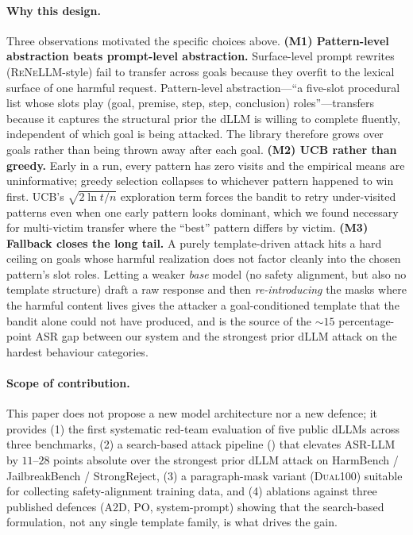 \paragraph{Why this design.}
Three observations motivated the specific choices above.
\textbf{(M1) Pattern-level abstraction beats prompt-level abstraction.}
Surface-level prompt rewrites (\textsc{ReNeLLM}-style) fail to transfer
across goals because they overfit to the lexical surface of one harmful
request. Pattern-level abstraction---``a five-slot procedural list whose
slots play (goal, premise, step, step, conclusion) roles''---transfers
because it captures the structural prior the dLLM is willing to complete
fluently, independent of which goal is being attacked. The library
therefore grows over goals rather than being thrown away after each goal.
\textbf{(M2) UCB rather than greedy.} Early in a run, every pattern has
zero visits and the empirical means are uninformative; greedy selection
collapses to whichever pattern happened to win first. UCB's $\sqrt{2\ln t/n}$
exploration term forces the bandit to retry under-visited patterns even
when one early pattern looks dominant, which we found necessary for
multi-victim transfer where the ``best'' pattern differs by victim.
\textbf{(M3) Fallback closes the long tail.} A purely template-driven
attack hits a hard ceiling on goals whose harmful realization does not
factor cleanly into the chosen pattern's slot roles. Letting a weaker
\emph{base} model (no safety alignment, but also no template structure)
draft a raw response and then \emph{re-introducing} the masks where the
harmful content lives gives the attacker a goal-conditioned template that
the bandit alone could not have produced, and is the source of the
$\sim 15$ percentage-point ASR gap between our system and the strongest
prior dLLM attack on the hardest behaviour categories.

\paragraph{Scope of contribution.}
This paper does not propose a new model architecture nor a new defence; it
provides (1) the first systematic red-team evaluation of five public dLLMs
across three benchmarks, (2) a search-based attack pipeline (\method) that
elevates ASR-LLM by $11$--$28$ points absolute over the strongest prior
dLLM attack on HarmBench / JailbreakBench / StrongReject, (3) a paragraph-mask
variant (\textsc{Dual100}) suitable for collecting safety-alignment training
data, and (4) ablations against three published defences (\textsc{A2D},
\textsc{PO}, system-prompt) showing that the search-based formulation, not
any single template family, is what drives the gain.
